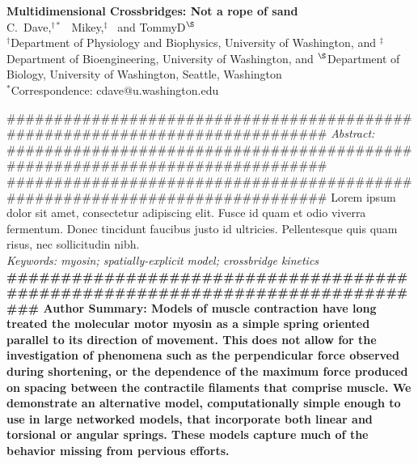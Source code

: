 \documentclass[11pt]{article}
\begin{document}
{\selectfont
\noindent \LARGE \textbf{
Multidimensional Crossbridges: Not a rope of sand }\\

	\large \noindent 
    C.~Dave,$^{\dagger \ast}$~
	Mikey,$^\ddagger$~
	and TommyD$^\S$\\ 
	\small 
	$^\dagger$Department of Physiology and Biophysics, University of Washington, and 
	$^\ddagger$Department of Bioengineering, University of Washington, and 
	$^\S$Department of Biology, University of Washington, Seattle, Washington \\
	$^\ast$Correspondence: cdave@u.washington.edu \\
	\normalsize


#############################################################################
\noindent \emph{Abstract:} 
#############################################################################
#############################################################################
Lorem ipsum dolor sit amet, consectetur adipiscing elit. Fusce id quam et odio viverra fermentum. Donec tincidunt faucibus justo id ultricies. Pellentesque quis quam risus, nec sollicitudin nibh. \\[.5em]
{\footnotesize \emph{
Keywords: myosin; spatially-explicit model; crossbridge kinetics}} \\[.5em]
{\footnotesize \textbf{
#############################################################################
Author Summary: 
Models of muscle contraction have long treated the molecular motor myosin as a simple spring oriented parallel to its direction of movement. This does not allow for the investigation of phenomena such as the perpendicular force observed during shortening, or the dependence of the maximum force produced on spacing between the contractile filaments that comprise muscle. We demonstrate an alternative model, computationally simple enough to use in large networked models, that incorporate both linear and torsional or angular springs. These models capture much of the behavior missing from pervious efforts.}}} \\
\end{document}
